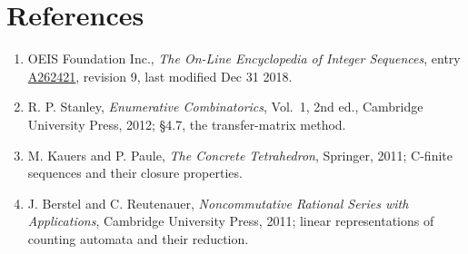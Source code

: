 \documentclass[11pt]{article}
\theoremstyle{definition}
\begin{document}
\section{References}

\begin{enumerate}

\item OEIS Foundation Inc., \emph{The On-Line Encyclopedia of Integer Sequences}, entry \href{https://oeis.org/A262421}{A262421}, revision 9, last modified Dec 31 2018.

\item R. P. Stanley, \emph{Enumerative Combinatorics}, Vol.~1, 2nd ed., Cambridge University Press, 2012; \S4.7, the transfer-matrix method.

\item M. Kauers and P. Paule, \emph{The Concrete Tetrahedron}, Springer, 2011; C-finite sequences and their closure properties.

\item J. Berstel and C. Reutenauer, \emph{Noncommutative Rational Series with Applications}, Cambridge University Press, 2011; linear representations of counting automata and their reduction.

\end{enumerate}
\end{document}
